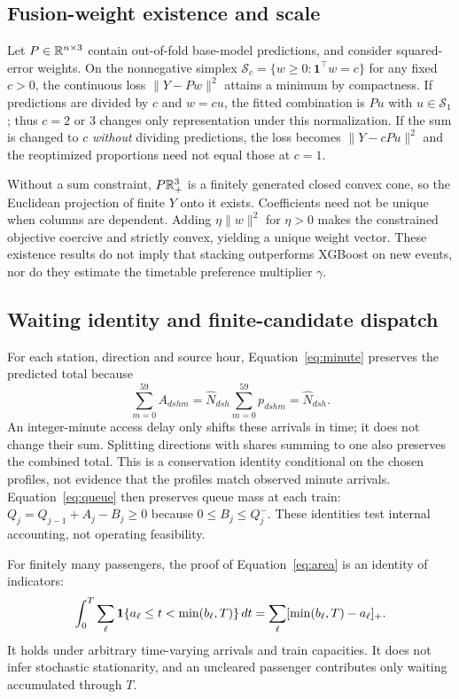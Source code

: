 \subsection{Fusion-weight existence and scale}
Let $P\in\mathbb R^{n\times3}$ contain out-of-fold base-model predictions, and consider squared-error weights. On the nonnegative simplex $\mathcal S_c=\{w\geq0:\mathbf1^\top w=c\}$ for any fixed $c>0$, the continuous loss $\|Y-Pw\|^2$ attains a minimum by compactness. If predictions are divided by $c$ and $w=cu$, the fitted combination is $Pu$ with $u\in\mathcal S_1$; thus $c=2$ or $3$ changes only representation under this normalization. If the sum is changed to $c$ \emph{without} dividing predictions, the loss becomes $\|Y-cPu\|^2$ and the reoptimized proportions need not equal those at $c=1$.

Without a sum constraint, $P\mathbb R_+^3$ is a finitely generated closed convex cone, so the Euclidean projection of finite $Y$ onto it exists. Coefficients need not be unique when columns are dependent. Adding $\eta\|w\|^2$ for $\eta>0$ makes the constrained objective coercive and strictly convex, yielding a unique weight vector. These existence results do not imply that stacking outperforms XGBoost on new events, nor do they estimate the timetable preference multiplier $\gamma$.

\subsection{Waiting identity and finite-candidate dispatch}
For each station, direction and source hour, Equation~\eqref{eq:minute} preserves the predicted total because
\[
\sum_{m=0}^{59}A_{dshm}
=\widehat N_{dsh}\sum_{m=0}^{59}p_{dshm}
=\widehat N_{dsh}.
\]
An integer-minute access delay only shifts these arrivals in time; it does not change their sum. Splitting directions with shares summing to one also preserves the combined total. This is a conservation identity conditional on the chosen profiles, not evidence that the profiles match observed minute arrivals. Equation~\eqref{eq:queue} then preserves queue mass at each train: $Q_j=Q_{j-1}+A_j-B_j\geq0$ because $0\leq B_j\leq Q_j^-$. These identities test internal accounting, not operating feasibility.

For finitely many passengers, the proof of Equation~\eqref{eq:area} is an identity of indicators:
\[
\int_0^T\sum_\ell\mathbf 1\{a_\ell\leq t<\min(b_\ell,T)\}\,dt
=\sum_\ell[\min(b_\ell,T)-a_\ell]_+.
\]
It holds under arbitrary time-varying arrivals and train capacities. It does not infer stochastic stationarity, and an uncleared passenger contributes only waiting accumulated through $T$.

